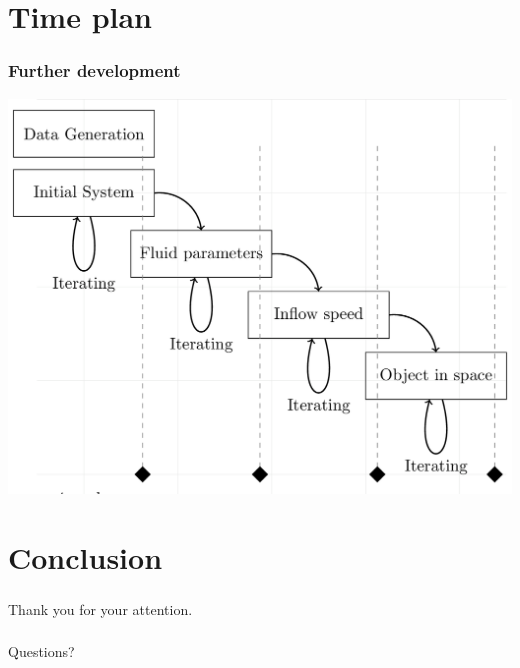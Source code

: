 \documentclass[18pt]{beamer}
\begin{document}
\section{Time plan}
\begin{frame}[t]
  \frametitle{Further development}
  \begin{center}
    \includegraphics[scale=0.17]{images/time}
  \end{center}
\end{frame}


\section{Conclusion}

\begin{frame}
  \frametitle{}
  \begin{center}
    \huge{Thank you for your attention.}
  \end{center}
\end{frame}

\begin{frame}
  \frametitle{}
  \begin{center}
    \huge{Questions?}
  \end{center}
\end{frame}
\end{document}
